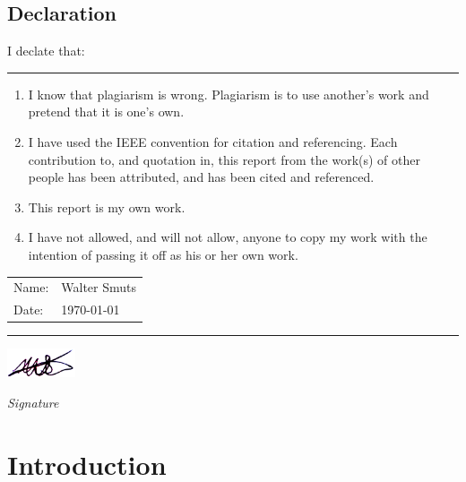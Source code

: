 \documentclass[12pt, twoside, openright]{report}
\begin{document}
\vfill
\vfill

\newpage
\null
\vfill

\section*{\center Declaration}
\thispagestyle{plain}

I declate that:
\vspace{3mm}
\hrule
\begin{enumerate}
\item
I know that plagiarism is wrong. Plagiarism is to use another’s work and
pretend that it is one’s own.
\item
I have used the IEEE convention for citation and referencing. Each contribution
to, and quotation in, this report from the work(s) of other people has been
attributed, and has been cited and referenced.
\item
This report is my own work.
\item
I have not allowed, and will not allow, anyone to copy my work with the
intention of passing it off as his or her own work.
\end{enumerate}

\begin{tabular}{ l l }
 Name: &  Walter Smuts\\
 Date: & \today
\end{tabular}
\vspace{3mm}
\hrule
\vspace{3mm}
\includegraphics[width=2cm]{Signature.png}
\par {\it Signature}

\vfill
\vfill

{\small\tableofcontents}
\thispagestyle{plain}


\chapter{Introduction}
\setcounter{page}{1}

\end{document}
